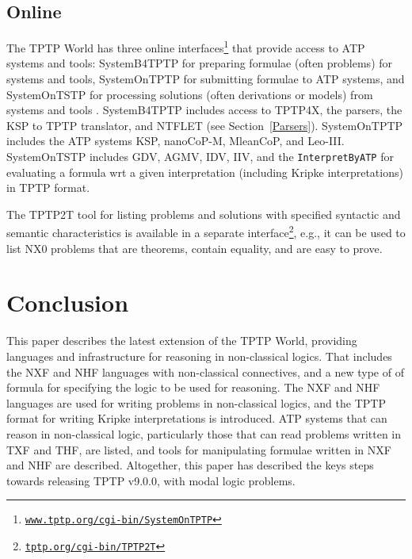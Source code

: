 \documentclass{ceurart}
\begin{document}
\subsection{Online}
\label{Online}

The TPTP World has three online interfaces\footnote{%
\href{https://www.tptp.org/cgi-bin/SystemOnTPTP}{\tt www.tptp.org/cgi-bin/SystemOnTPTP}}
that provide access to ATP systems and tools:
SystemB4TPTP for preparing formulae (often problems) for systems and tools, SystemOnTPTP for 
submitting formulae to ATP systems, and SystemOnTSTP for processing solutions (often derivations
or models) from systems and tools \cite{Sut00-CADE-17,Sut07-CSR}.
SystemB4TPTP includes access to TPTP4X, the parsers, the KSP to TPTP translator, and NTFLET (see 
Section~\ref{Parsers}).
SystemOnTPTP includes the ATP systems KSP, nanoCoP-M, MleanCoP, and Leo-III.
SystemOnTSTP includes GDV, AGMV, IDV, IIV, and the {\tt InterpretByATP} for evaluating a formula
wrt a given interpretation (including Kripke interpretations) in TPTP format.

The TPTP2T tool for listing problems and solutions with specified syntactic and semantic 
characteristics is available in a separate interface\footnote{%
\href{https://tptp.org/cgi-bin/TPTP2T}{\tt tptp.org/cgi-bin/TPTP2T}}, e.g., it can be used to 
list NX0 problems that are theorems, contain equality, and are easy to prove.

\section{Conclusion}
\label{Conclusion}

This paper describes the latest extension of the TPTP World, providing languages and
infrastructure for reasoning in non-classical logics.
That includes the NXF and NHF languages with non-classical connectives, and a new type of
of formula for specifying the logic to be used for reasoning.
The NXF and NHF languages are used for writing problems in non-classical logics, and the
TPTP format for writing Kripke interpretations is introduced.
ATP systems that can reason in non-classical logic, particularly those that can read 
problems written in TXF and THF, are listed, and tools for manipulating formulae written in 
NXF and NHF are described.
Altogether, this paper has described the keys steps towards releasing TPTP v9.0.0,
with modal logic problems.
\end{document}
